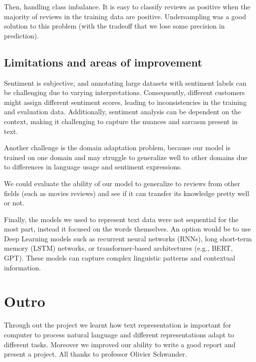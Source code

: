 \documentclass{article}
\begin{document}
Then, handling class imbalance. It is easy to classify reviews as positive when the majority of reviews in the training data are positive. Undersampling was a good solution to this problem (with the tradeoff that we lose some precision in prediction). 

\subsection{Limitations and areas of improvement}

Sentiment is subjective, and annotating large datasets with sentiment labels can be challenging due to varying interpretations. Consequently, different customers might assign different sentiment scores, leading to inconsistencies in the training and evaluation data. Additionally, sentiment analysis can be dependent on the context, making it challenging to capture the nuances and sarcasm present in text. 

Another challenge is the domain adaptation problem, because our model is trained on one domain and may struggle to generalize well to other domains due to differences in language usage and sentiment expressions.

We could evaluate the ability of our model to generalize to reviews from other fields (such as movies reviews) and see if it can transfer its knowledge pretty well or not.

Finally, the models we used to represent text data were not sequential for the most part, instead it focused on the words themselves. An option would be to use Deep Learning models such as recurrent neural networks (RNNs), long short-term memory (LSTM) networks, or transformer-based architectures (e.g., BERT, GPT). These models can capture complex linguistic patterns and contextual information. 



\section{Outro}

Through out the project we learnt how text representation is important for computer to process natural language and different
representations adapt to different tasks. Moreover we improved our ability to write a good report
and present a project. All thanks to professor Olivier Schwander.

\printbibliography
\end{document}
